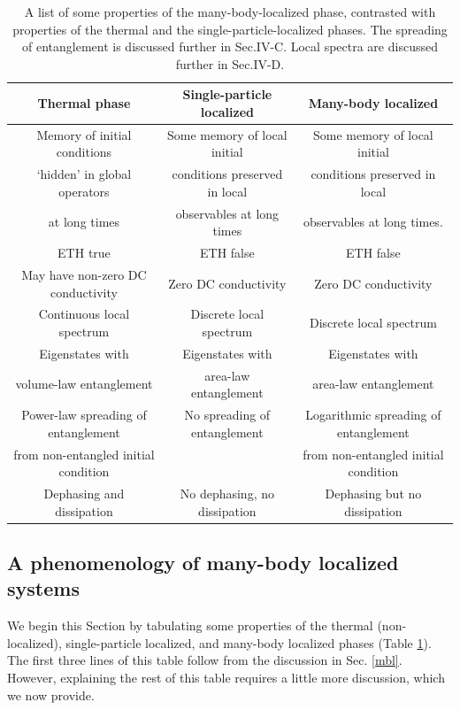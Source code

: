\documentclass[amsmath,onecolumn, superscriptaddress,preprint,aps]{revtex4}
\begin{document}
 \begin{table}
 \begin{tabular}{c|c|c}
	Thermal phase & Single-particle localized & Many-body localized\\
		\hline
	Memory of initial conditions & Some memory of local initial & Some memory of local initial \\ `hidden' in global operators & conditions preserved in local & conditions preserved in local \\ at long times & observables at long times & observables at long times. \\
	\hline
	ETH true & ETH false & ETH false\\
	\hline
	May have non-zero DC conductivity & Zero DC conductivity & Zero DC conductivity\\
	\hline
	Continuous local spectrum  & Discrete local spectrum & Discrete local spectrum  \\
	\hline
	Eigenstates with & Eigenstates with & Eigenstates with \\
	volume-law entanglement & area-law entanglement & area-law entanglement \\
	\hline
	Power-law spreading of entanglement & No spreading of entanglement & Logarithmic spreading of entanglement \\
	from non-entangled initial condition &   & from non-entangled initial condition \\
	\hline
	Dephasing and dissipation & No dephasing, no dissipation & Dephasing but no dissipation\\

  \end{tabular}
   \caption{\label{table of contrasts} A list of some properties of the many-body-localized phase, contrasted with properties of the thermal and the single-particle-localized phases. The spreading of entanglement is discussed further in Sec.IV-C. Local spectra are discussed further in Sec.IV-D.}
  \end{table}


  \subsection{A phenomenology of many-body localized systems}
  \label{phenomenology}

  We begin this Section by tabulating some properties of the thermal (non-localized), single-particle localized, and many-body localized phases (Table \ref{table of contrasts}).  The first three lines of this table follow from the discussion in Sec. \ref{mbl}.  However, explaining the rest of this table requires a little more discussion, which we now provide.
\end{document}
